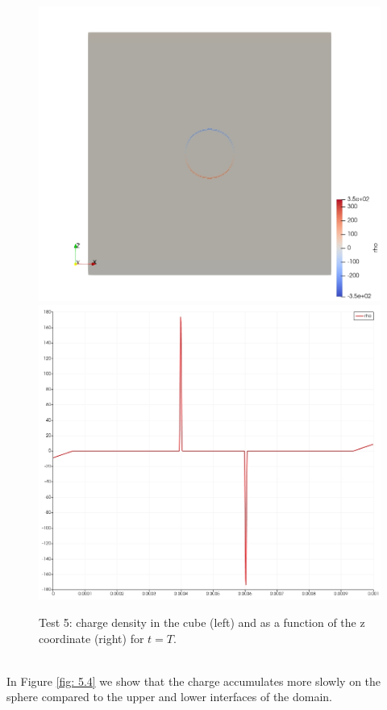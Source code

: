 \documentclass{Configuration_Files/PoliMi3i_thesis}
\begin{document}
\begin{figure}[h!]
    \centering
   \includegraphics[scale=0.2]{Images/5.rho_3d.jpeg}
   \includegraphics[scale=0.2]{Images/5.rho.jpeg}
    \caption {Test 5: charge density in the cube (left) and as a function of the z coordinate (right) for $t=T$.}
    \label{fig: 5.3}
\end{figure}
\\In Figure \ref{fig: 5.4} we show that the charge accumulates more slowly on the sphere compared to the upper and lower interfaces of the domain.
\end{document}
